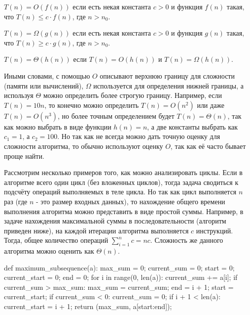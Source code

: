 \begin{definition}
$T(n) = O(f(n))$ если есть некая константа $c > 0$ и функция $f(n)$ такая, что $T(n) \le c \cdot f(n)$, где $n>n_0$.
\end{definition}

\begin{definition}
$T(n) = \Omega(g(n))$ если есть некая константа $c > 0$ и функция $g(n)$ такая, что $T(n) \ge c \cdot g(n)$, где $n>n_0$.
\end{definition}

\begin{definition}
$T(n) = \Theta(h(n))$ если $T(n) = O(h(n))$ и $T(n) = \Omega(h(n))$.
\end{definition}

Иными словами, с помощью $O$ описывают верхнюю границу для сложности (памяти или вычислений), $\Omega$ используется для определения нижней границы, а используя $\Theta$ можно определить более строгую 
границу. Например, если $T(n) = 10n$, то конечно можно определить $T(n) = O(n^2)$ или даже $T(n) = O(n^3)$,
но более точным определением будет $T(n) = \Theta(n)$, так как можно выбрать в виде функции $h(n) = n$, а две константы выбрать как $c_1=1$, а $c_2=100$. Но так как не всегда можно дать точную оценку для 
сложности алгоритма, то обычно используют оценку $O$, так как её часто бывает проще найти.

Рассмотрим несколько примеров того, как можно анализировать циклы. Если в алгоритме 
всего один цикл (без вложенных циклов), тогда задача сводиться к подсчёту операций 
выполняемых в теле цикла. Но так как цикл выполняется $n$ раз (где $n$ - это размер входных 
данных), то нахождение общего времени выполнения алгоритма можно представить в виде простой суммы.
Например, в задаче нахождения максимальной суммы в последовательности (алгоритм приведен ниже),
на каждой итерации алгоритма выполняется $c$ инструкций. Тогда, общее количество операций 
$\sum_{i=1}^n c = nc$. Сложность же данного алгоритма можно оценить как $\Theta(n)$.

\begin{python}
def maximum_subsequence(a):
	max_sum = 0;
	current_sum = 0;
	start = 0;
	current_start = 0;
	end = 0;
	for i in range(0, len(a)):
		current_sum += a[i];
		if current_sum > max_sum:
			max_sum = current_sum;
			end = i + 1;
			start = current_start;
		if current_sum < 0:
			current_sum = 0;
			if i + 1 < len(a):
				current_start = i + 1;
	return (max_sum, a[start:end]);
\end{python}

